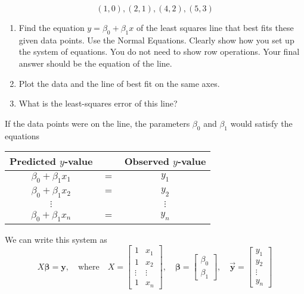 \documentclass[letter,11pt]{article}
\theoremstyle{definition}
\begin{document}
$$(1,0),(2,1),(4,2), (5,3)$$
\begin{enumerate}
    \item Find the equation $y=\beta_{0}+\beta_{1}x$ of the least squares line that best fits these given data points. Use the Normal Equations. Clearly show how you set up the system of equations. You do not need to show row operations. Your final answer should be the equation of the line.
    \item Plot the data and the line of best fit on the same axes.
    \item What is the least-squares error of this line?
\end{enumerate}

\begin{tcolorbox}[boxrule=1mm,enhanced jigsaw, breakable,before=\hfill,after=\hfill,adjusted title={Problem 6 solutions}]
    If the data points were on the line, the parameters $\beta_{0}$ and $\beta_{1}$ would satisfy the equations

\begin{center}
\begin{tabular}{ccc}
\toprule
Predicted $y$-value & \hspace{1cm} & Observed $y$-value \\ \midrule
$\beta_{0}+\beta_{1}x_{1}$ & $=$ & $y_{1}$  \\
$\beta_{0}+\beta_{1}x_{2}$ & $=$ & $y_{2}$  \\
$\vdots$                   &     & $\vdots$ \\
$\beta_{0}+\beta_{1}x_{n}$ & $=$ & $y_{n}$  \\ \bottomrule
\end{tabular}
\end{center}
We can write this system as
\begin{equation}
    X \boldsymbol{\beta}=\boldsymbol{y}, \quad\text{where} \quad X=\begin{bmatrix} 1 & x_1 \\ 1 & x_2 \\ \vdots & \vdots \\ 1 & x_n\end{bmatrix}, \quad \boldsymbol{\beta}=\begin{bmatrix}\beta_0 \\ \beta_1\end{bmatrix}, \quad \vec{\boldsymbol{y}}=\begin{bmatrix}y_1 \\ y_2 \\ \vdots \\ y_n\end{bmatrix}
\end{equation}


\end{tcolorbox}
\end{document}

